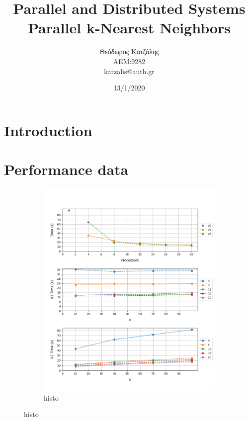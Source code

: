\documentclass[12pt, a4paper]{article}
\title{\textbf{Parallel and Distributed Systems \\ Parallel k-Nearest Neighbors}}
\author{Θεόδωρος Κατζάλης \\ ΑΕΜ:9282 \\ katzalis@auth.gr}
\date{13/1/2020}
\begin{document}
\sloppy
%
\maketitle



\vspace{0.1cm}
\section{Introduction}
\vspace{0.2cm}

\section{Performance data}

\begin{figure}[h!]
     \begin{subfigure}[b]{0.33\textwidth}
         \centering
         \includegraphics[height=.4\textheight, width=\textwidth, keepaspectratio]{assets/corel/histo.png}
    \caption{histo}
     \end{subfigure}

\end{figure}
\end{document}
